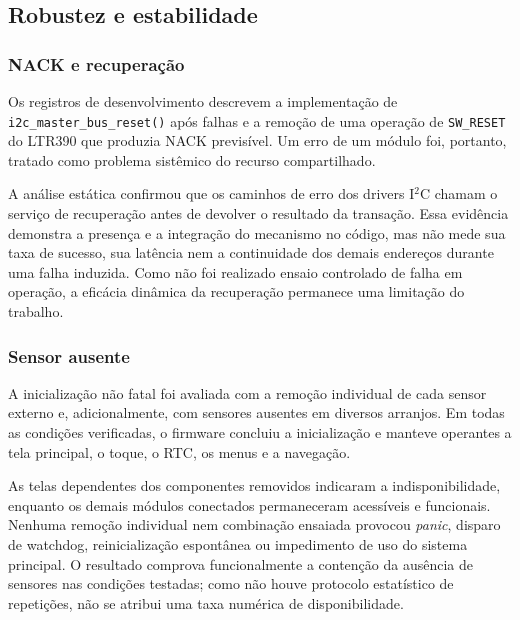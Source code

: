\documentclass[a4paper,12pt]{article}
\begin{document}
\subsection{Robustez e estabilidade}


\subsubsection{NACK e recupera\c{c}\~ao}


Os registros de desenvolvimento descrevem a implementa\c{c}\~ao de \texttt{i2c\_master\_bus\_\allowbreak reset()} ap\'os falhas e a remo\c{c}\~ao de uma opera\c{c}\~ao de \texttt{SW\_RESET} do LTR390 que produzia NACK previs\'ivel. Um erro de um m\'odulo foi, portanto, tratado como problema sist\^emico do recurso compartilhado.

A an\'alise est\'atica confirmou que os caminhos de erro dos drivers I$^2$C chamam o servi\c{c}o de recupera\c{c}\~ao antes de devolver o resultado da transa\c{c}\~ao. Essa evid\^encia demonstra a presen\c{c}a e a integra\c{c}\~ao do mecanismo no c\'odigo, mas n\~ao mede sua taxa de sucesso, sua lat\^encia nem a continuidade dos demais endere\c{c}os durante uma falha induzida. Como n\~ao foi realizado ensaio controlado de falha em opera\c{c}\~ao, a efic\'acia din\^amica da recupera\c{c}\~ao permanece uma limita\c{c}\~ao do trabalho.


\subsubsection{Sensor ausente}


A inicializa\c{c}\~ao n\~ao fatal foi avaliada com a remo\c{c}\~ao individual de cada sensor externo e, adicionalmente, com sensores ausentes em diversos arranjos. Em todas as condi\c{c}\~oes verificadas, o firmware concluiu a inicializa\c{c}\~ao e manteve operantes a tela principal, o toque, o RTC, os menus e a navega\c{c}\~ao.

As telas dependentes dos componentes removidos indicaram a indisponibilidade, enquanto os demais m\'odulos conectados permaneceram acess\'iveis e funcionais. Nenhuma remo\c{c}\~ao individual nem combina\c{c}\~ao ensaiada provocou \emph{panic}, disparo de watchdog, reinicializa\c{c}\~ao espont\^anea ou impedimento de uso do sistema principal. O resultado comprova funcionalmente a conten\c{c}\~ao da aus\^encia de sensores nas condi\c{c}\~oes testadas; como n\~ao houve protocolo estat\'istico de repeti\c{c}\~oes, n\~ao se atribui uma taxa num\'erica de disponibilidade.
\end{document}
